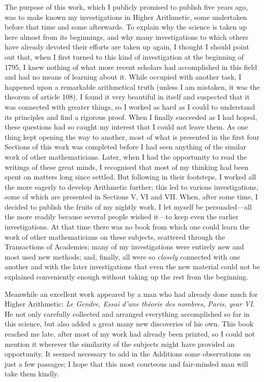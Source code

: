 The purpose of this work, which I publicly promised to publish five years ago, was to make known my investigations in Higher Arithmetic, some undertaken before that time and some afterwards. To explain why the science is taken up here almost from its beginnings, and why many investigations to which others have already devoted their efforts are taken up again, I thought I should point out that, when I first turned to this kind of investigation at the beginning of 1795, I knew nothing of what more recent scholars had accomplished in this field and had no means of learning about it. While occupied with another task, I happened upon a remarkable arithmetical truth (unless I am mistaken, it was the theorem of article 108). I found it very beautiful in itself and suspected that it was connected with greater things, so I worked as hard as I could to understand its principles and find a rigorous proof. When I finally succeeded as I had hoped, these questions had so caught my interest that I could not leave them. As one thing kept opening the way to another, most of what is presented in the first four Sections of this work was completed before I had seen anything of the similar work of other mathematicians. Later, when I had the opportunity to read the writings of these great minds, I recognised that most of my thinking had been spent on matters long since settled. But following in their footsteps, I worked all the more eagerly to develop Arithmetic further; this led to various investigations, some of which are presented in Sections V, VI and VII. When, after some time, I decided to publish the fruits of my nightly work, I let myself be persuaded---all the more readily because several people wished it---to keep even the earlier investigations. At that time there was no book from which one could learn the work of other mathematicians on these subjects, scattered through the Transactions of Academies; many of my investigations were entirely new and most used new methods; and, finally, all were so \emph{closely} connected with one another and with the later investigations that even the new material could not be explained conveniently enough without taking up the rest from the beginning.

Meanwhile an excellent work appeared by a man who had already done much for Higher Arithmetic: \emph{Le Gendre, Essai d'une théorie des nombres, Paris, year VI}. He not only carefully collected and arranged everything accomplished so far in this science, but also added a great many new discoveries of his own. This book reached me late, after most of my work had already been printed, so I could not mention it wherever the similarity of the subjects might have provided an opportunity. It seemed necessary to add in the Additions some observations on just a few passages; I hope that this most courteous and fair-minded man will take them kindly.


